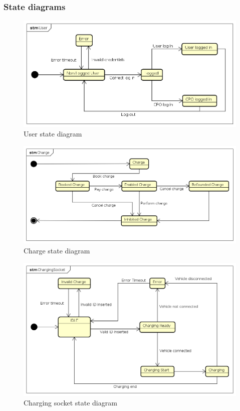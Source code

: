 \subsubsection{State diagrams}
\begin{figure}[h!]
    \begin{center}
        \includegraphics[keepaspectratio, width=16cm]{StateDiagrams/User.png}
        \caption{User state diagram}
    \end{center}
\end{figure}
\begin{figure}[h!]
    \begin{center}
        \includegraphics[keepaspectratio, width=16cm]{StateDiagrams/Charge.png}
        \caption{Charge state diagram}
    \end{center}
\end{figure}
\begin{figure}[h!]
    \begin{center}
        \includegraphics[keepaspectratio, width=16cm]{StateDiagrams/ChargingSocket.png}
        \caption{Charging socket state diagram}
    \end{center}
\end{figure}
\clearpage

